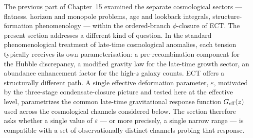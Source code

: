 %
%
%

The previous part of Chapter~15 examined the separate cosmological
sectors --- flatness, horizon and monopole problems, age and lookback
integrals, structure-formation phenomenology --- within the
ordered-branch $\phi$-closure of ECT. The present section addresses a
different kind of question. In the standard phenomenological treatment
of late-time cosmological anomalies, each tension typically receives
its own parameterisation: a pre-recombination component for the Hubble
discrepancy, a modified gravity law for the late-time growth sector,
an abundance enhancement factor for the high-$z$ galaxy counts. ECT
offers a structurally different path. A single effective deformation
parameter, $\varepsilon$, motivated by the three-stage
condensate-closure picture and tested here at the effective level,
parametrizes the common late-time gravitational response function
$G_{\rm eff}(z)$ used across the cosmological channels considered
below. The section
therefore asks whether a single value of $\varepsilon$ --- or more
precisely, a single narrow range --- is compatible with a set of
observationally distinct channels probing that response.

